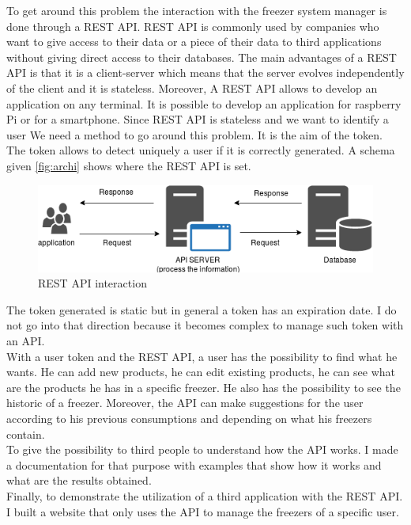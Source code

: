 To get around this problem the interaction with the freezer system manager is done through a REST API. REST API is commonly used by companies who want to give access to their data or a piece of their data to third applications without giving direct access to their databases. The main advantages of a REST API is that it is a client-server which means that the server evolves independently of the client and it is stateless. Moreover, A REST API allows to develop an application on any terminal. It is possible to develop an application for raspberry Pi or for a smartphone. Since REST API is stateless and we want to identify a user We need a method to go around this problem. It is the aim of the token. The token allows to detect uniquely a user if it is correctly generated. A schema given \autoref{fig:archi} shows where the REST API is set. \\
\begin{figure}[H]
\centering
\includegraphics[scale=0.5]{./images/archi.png}
\caption{REST API interaction}
\label{fig:archi}
\end{figure}

The token generated is static but in general a token has an expiration date. I do not go into that direction because it becomes complex to manage such token with an API.\\

With a user token and the REST API, a user has the possibility to find what he wants. He can add new products, he can edit existing products, he can see what are the products he has in a specific freezer. He also has the possibility to see the historic of a freezer. Moreover, the API can make suggestions for the user according to his previous consumptions and depending on what his freezers contain.\\

To give the possibility to third people to understand how the API works. I made a documentation for that purpose with examples that show how it works and what are the results obtained. \\

Finally, to demonstrate the utilization of a third application with the REST API. I built a website that only uses the API to manage the freezers of a specific user.\\


